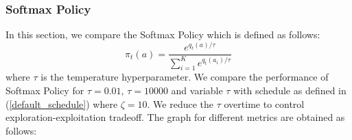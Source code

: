 \documentclass{article}
\begin{document}
		
		\subsubsection{Softmax Policy}
		
		In this section, we compare the Softmax Policy which is defined as follows:
		\begin{equation}
		\nonumber
			\pi_{t}(a) = \frac{e^{q_{t}(a)/\tau}}{\sum_{i=1}^{K} e^{q_{t}(a_{i})/\tau}}
		\end{equation}
		where $\tau$ is the temperature hyperparameter. We compare the performance of Softmax Policy for $\tau=0.01$, $\tau=10000$ and variable $\tau$ with 
		schedule as defined in (\ref{default_schedule}) where $\zeta=10$. We reduce the $\tau$ overtime to control exploration-exploitation tradeoff. The graph for 
		different metrics are obtained as follows:
		
\end{document}
